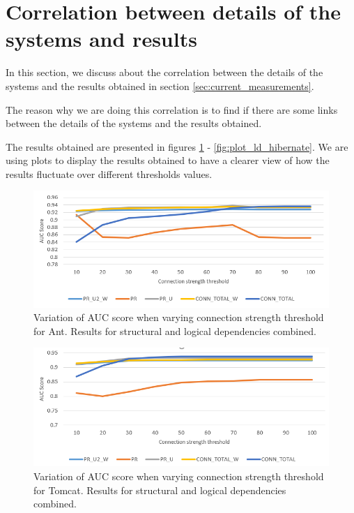 \documentclass[12pt, a4paper, twoside]{report}
\begin{document}
\section{Correlation between details of the systems and results}
\label{sec:overlapping}

In this section, we discuss about the correlation between the details of the systems and the results obtained in section \ref{sec:current_measurements}.

The reason why we are doing this correlation is to find if there are some links between the details of the systems and the results obtained. 

The results obtained are presented in figures \ref{fig:plot_sd_ld_ant} - \ref{fig:plot_ld_hibernate}. We are using plots to display the results obtained to have a clearer view of how the results fluctuate over different thresholds values.




\begin{figure}[H]
\centering
\includegraphics[width=\textwidth]{ant_SD_LD.PNG}
\caption{Variation of AUC score when varying connection strength threshold for Ant. Results for structural and logical dependencies combined. }
\label{fig:plot_sd_ld_ant}
\centering
\end{figure}


\begin{figure}[H]
\centering
\includegraphics[width=\textwidth]{tomcat_SD_LD.PNG}
\caption{Variation of AUC score when varying connection strength threshold for Tomcat. Results for structural and logical dependencies combined. }
\label{fig:plot_sd_ld_tomcat}
\centering
\end{figure}
\end{document}
